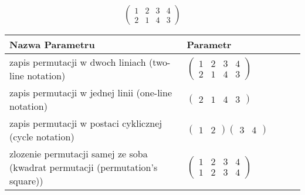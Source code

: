 \documentclass[12pt]{article}
\begin{document}
\subsection{}
\begin{center}
\[
\begin{pmatrix}
	1 & 2 & 3 & 4 \\ 
	2 & 1 & 4 & 3 
\end{pmatrix}
\]

\begin{tabular}{|m{0.6\linewidth}|m{0.4\linewidth}|}
	\hline
	Nazwa Parametru & Parametr \\
	\hline
	zapis permutacji w dwoch liniach (two-line notation) & $\begin{pmatrix} 1 & 2 & 3 & 4 \\ 
2 & 1 & 4 & 3 \end{pmatrix}$ \\ 
	\hline
	zapis permutacji w jednej linii (one-line notation) & $\begin{pmatrix} 2 & 1 & 4 & 3 \end{pmatrix}$ \\ 
	\hline
	zapis permutacji w postaci cyklicznej (cycle notation) & $\begin{pmatrix} 1 & 2 \end{pmatrix} \begin{pmatrix} 3 & 4 \end{pmatrix} $ \\ 
	\hline
	zlozenie permutacji samej ze soba (kwadrat permutacji (permutation's square)) & $\begin{pmatrix} 1 & 2 & 3 & 4 \\ 
1 & 2 & 3 & 4 \end{pmatrix}$ \\ 
	\hline
\end{tabular}
\end{center}
\end{document}
